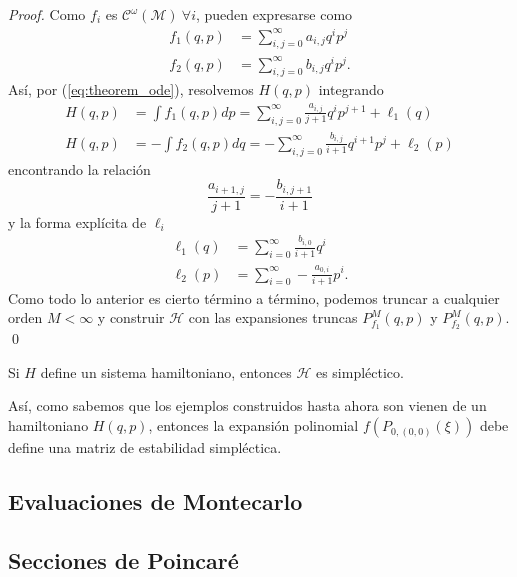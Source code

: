 \begin{proof}
Como $f_i$ es $\mathcal{C}^\omega(\mathcal{M}) \ \forall i$, pueden expresarse como
\begin{align*}
 f_1(q,p) &= \sum_{i,j = 0}^\infty a_{i,j} q^i p^j \\
 f_2(q,p) &= \sum_{i,j = 0}^\infty b_{i,j} q^i p^j. 
\end{align*}
Así, por (\ref{eq:theorem_ode}), resolvemos $H(q,p)$ integrando
\begin{align*}
 H(q,p) &= \int f_1(q,p) dp = \sum_{i,j = 0}^\infty \frac{a_{i,j}}{j+1} q^i p^{j+1} + \ell_1(q) \\
 H(q,p) &= -\int f_2(q,p) dq = -\sum_{i,j = 0}^\infty \frac{b_{i,j}}{i+1} q^{i+1} p^j + \ell_2(p)
\end{align*}
encontrando la relación 
\begin{equation*}
 \frac{a_{i+1,j}}{j+1} = - \frac{b_{i,j+1}}{i+1} 
\end{equation*}
y la forma explícita de $\ell_i$
\begin{align*}
 \ell_1(q) &= \sum_{i=0}^\infty \frac{b_{i,0}}{i+1} q^i \\
 \ell_2(p) &= \sum_{i=0}^\infty -\frac{a_{0,i}}{i+1} p^i.
\end{align*}
Como todo lo anterior es cierto término a término, podemos truncar a cualquier orden $M < \infty$ y construir $\mathcal{H}$ con las expansiones truncas $P_{f_1}^M(q,p)$ y $P_{f_2}^M(q,p)$. \qed
\end{proof}

\begin{corolario}
Si $H$ define un sistema hamiltoniano, entonces $\mathcal{H}$ es simpléctico. 
\end{corolario}

Así, como sabemos que los ejemplos construidos hasta ahora son vienen de un hamiltoniano $H(q,p)$, entonces la expansión polinomial $f(P_{0,(0,0)}(\xi))$ debe define una matriz de estabilidad simpléctica. 




\subsection{Evaluaciones de Montecarlo}
\label{sec:montecarlo}


\subsection{Secciones de Poincaré}


